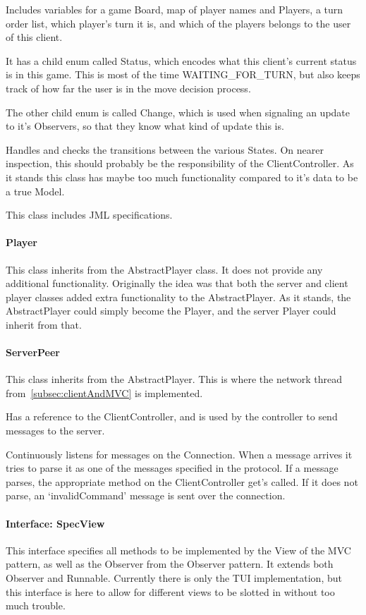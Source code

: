 \documentclass[12pt, letterpaper]{article}
\begin{document}
    Includes variables for a game Board, map of player names and Players, a turn order list,
    which player's turn it is, and which of the players belongs to the user of this client.

    It has a child enum called Status, which encodes what this client's current status is in this game.
    This is most of the time WAITING\_FOR\_TURN, but also keeps track of how far the user is in the move decision
    process.

    The other child enum is called Change, which is used when signaling an update to it's Observers, so that they
    know what kind of update this is.

    Handles and checks the transitions between the various States.
    On nearer inspection, this should probably be the responsibility of the ClientController.
    As it stands this class has maybe too much functionality compared to it's data to be a true Model.

    This class includes JML specifications.

    \paragraph{Player}
    This class inherits from the AbstractPlayer class.
    It does not provide any additional functionality.
    Originally the idea was that both the server and client player classes added extra functionality to the
    AbstractPlayer.
    As it stands, the AbstractPlayer could simply become the Player, and the server Player could inherit from that.

    \paragraph{ServerPeer}
    This class inherits from the AbstractPlayer.
    This is where the network thread from~\autoref{subsec:clientAndMVC} is implemented.

    Has a reference to the ClientController, and is used by the controller to send messages to the server.

    Continuously listens for messages on the Connection.
    When a message arrives it tries to parse it as one of the messages specified in the protocol.
    If a message parses, the appropriate method on the ClientController get's called.
    If it does not parse, an `invalidCommand' message is sent over the connection.


    \paragraph{Interface: SpecView}
    This interface specifies all methods to be implemented by the View of the MVC pattern, as well as the Observer
    from the Observer pattern.
    It extends both Observer and Runnable.
    Currently there is only the TUI implementation, but this interface is here to allow for different views to be
    slotted in without too much trouble.
\end{document}
